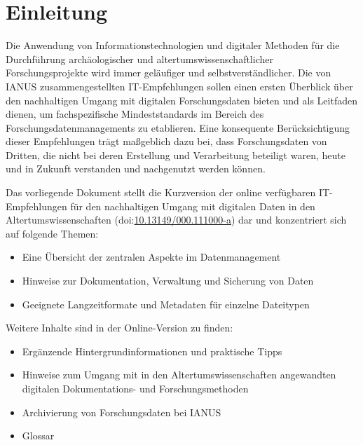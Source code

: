 \documentclass[a4paper]{report}
\begin{document}
\chapter{Einleitung}
Die Anwendung von Informationstechnologien und digitaler Methoden für die Durchführung archäologischer und altertumswissenschaftlicher Forschungsprojekte wird  immer geläufiger und selbstverständlicher. Die von IANUS zusammengestellten IT-Empfehlungen sollen einen ersten Überblick über den nachhaltigen Umgang mit digitalen Forschungsdaten bieten und als Leitfaden dienen, um fachspezifische Mindeststandards im Bereich des Forschungsdatenmanagements zu etablieren. Eine konsequente Berücksichtigung dieser Empfehlungen trägt maßgeblich dazu bei, dass Forschungsdaten von Dritten, die nicht bei deren Erstellung und Verarbeitung beteiligt waren, heute und in Zukunft verstanden und nachgenutzt werden können. 

Das vorliegende Dokument stellt die Kurzversion der online verfügbaren IT-Empfehlungen für den nachhaltigen Umgang mit digitalen Daten in den Altertumswissenschaften (doi:\href{http://dx.doi.org/10.13149/000.111000-a}{10.13149/000.111000-a}) dar und konzentriert sich auf folgende Themen:
\begin{itemize}
	\item Eine Übersicht der zentralen Aspekte im Datenmanagement
	\item Hinweise zur Dokumentation, Verwaltung und Sicherung von Daten
	\item Geeignete Langzeitformate und Metadaten für einzelne Dateitypen
\end{itemize}

Weitere Inhalte sind in der Online-Version zu finden:
\begin{itemize}
	\item Ergänzende Hintergrundinformationen und praktische Tipps
	\item Hinweise zum Umgang mit in den Altertumswissenschaften angewandten digitalen Dokumentations- und Forschungsmethoden
	\item Archivierung von Forschungsdaten bei IANUS
	\item Glossar
\end{itemize}
\end{document}
